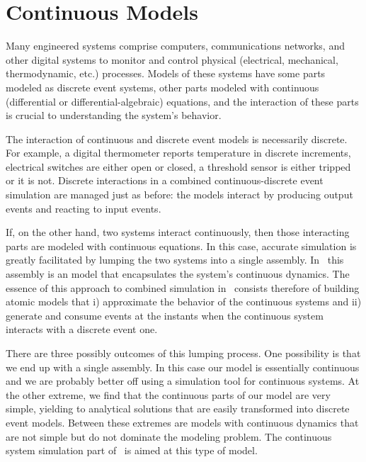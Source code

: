 \chapter{Continuous Models}
Many engineered systems comprise computers, communications networks, and other digital systems to monitor and control physical (electrical, mechanical, thermodynamic, etc.) processes. Models of these systems have some parts modeled as discrete event systems, other parts modeled with continuous (differential or differential-algebraic) equations, and the interaction of these parts is crucial to understanding the system's behavior.

The interaction of continuous and discrete event models is necessarily discrete. For example, a digital thermometer reports temperature in discrete increments, electrical switches are either open or closed, a threshold sensor is either tripped or it is not. Discrete interactions in a combined continuous-discrete event simulation are managed just as before: the models interact by producing output events and reacting to input events.

If, on the other hand, two systems interact continuously, then those interacting parts are modeled with continuous equations. In this case, accurate simulation is greatly facilitated by lumping the two systems into a single assembly. In \adevs\ this assembly is an  model that encapsulates the system's continuous dynamics. The essence of this approach to combined simulation in \adevs\ consists therefore of building atomic models that i) approximate the behavior of the continuous systems and ii) generate and consume events at the instants when the continuous system interacts with a discrete event one.

There are three possibly outcomes of this lumping process. One possibility is that we end up with a single assembly. In this case our model is essentially continuous and we are probably better off using a simulation tool for continuous systems. At the other extreme, we find that the continuous parts of our model are very simple, yielding to analytical solutions that are easily transformed into discrete event models. Between these extremes are models with continuous dynamics that are not simple but do not dominate the modeling problem. The continuous system simulation part of \adevs\ is aimed at this type of model.

